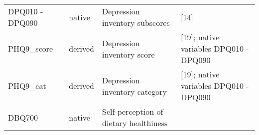 \documentclass[]{article}
\begin{document}
\begin{longtable}[]{@{}llll@{}}
\begin{minipage}[t]{0.10\columnwidth}
DPQ010 - DPQ090\strut
\end{minipage} & \begin{minipage}[t]{0.05\columnwidth}\raggedright
native\strut
\end{minipage} & \begin{minipage}[t]{0.43\columnwidth}\raggedright
Depression inventory subscores\strut
\end{minipage} & \begin{minipage}[t]{0.31\columnwidth}\raggedright
{[}14{]}\strut
\end{minipage}\tabularnewline
\begin{minipage}[t]{0.10\columnwidth}\raggedright
PHQ9\_score\strut
\end{minipage} & \begin{minipage}[t]{0.05\columnwidth}\raggedright
derived\strut
\end{minipage} & \begin{minipage}[t]{0.43\columnwidth}\raggedright
Depression inventory score\strut
\end{minipage} & \begin{minipage}[t]{0.31\columnwidth}\raggedright
{[}19{]}; native variables DPQ010 - DPQ090\strut
\end{minipage}\tabularnewline
\begin{minipage}[t]{0.10\columnwidth}\raggedright
PHQ9\_cat\strut
\end{minipage} & \begin{minipage}[t]{0.05\columnwidth}\raggedright
derived\strut
\end{minipage} & \begin{minipage}[t]{0.43\columnwidth}\raggedright
Depression inventory category\strut
\end{minipage} & \begin{minipage}[t]{0.31\columnwidth}\raggedright
{[}19{]}; native variables DPQ010 - DPQ090\strut
\end{minipage}\tabularnewline
\begin{minipage}[t]{0.10\columnwidth}\raggedright
DBQ700\strut
\end{minipage} & \begin{minipage}[t]{0.05\columnwidth}\raggedright
native\strut
\end{minipage} & \begin{minipage}[t]{0.43\columnwidth}\raggedright
Self-perception of dietary healthiness\strut
\end{minipage} & \begin{minipage}[t]{0.31\columnwidth}\raggedright

\end{minipage}
\end{longtable}
\end{document}
